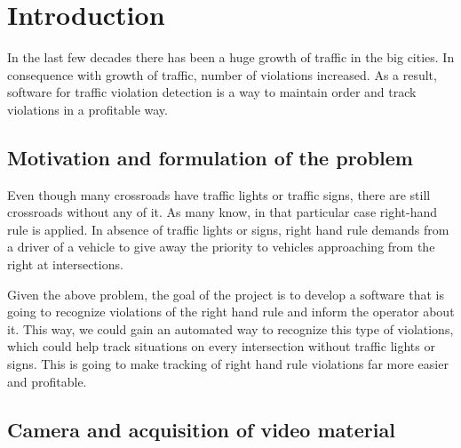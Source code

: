 \documentclass[12pt]{article} %
\begin{document}

\tableofcontents %

\newpage %


\section{Introduction} %

In the last few decades there has been a huge growth of traffic in the big cities. In consequence with growth of traffic, number of violations increased. As a result, software for traffic violation detection is a way to maintain order and track violations in a profitable way.


\subsection{Motivation and formulation of the problem} %

Even though many crossroads have traffic lights or traffic signs, there are still crossroads without any of it. As many know, in that particular case right-hand rule is applied. In absence of traffic lights or signs, right hand rule demands from a driver of a vehicle to give away the priority to vehicles approaching from the right at intersections.

Given the above problem, the goal of the project is to develop a software that is going to recognize violations of the right hand rule and inform the operator about it. This way, we could gain an automated way to recognize this type of violations, which could help track situations on every intersection without traffic lights or signs. This is going to make tracking of right hand rule violations far more easier and profitable.


\subsection{Camera and acquisition of video material} %
\end{document}
